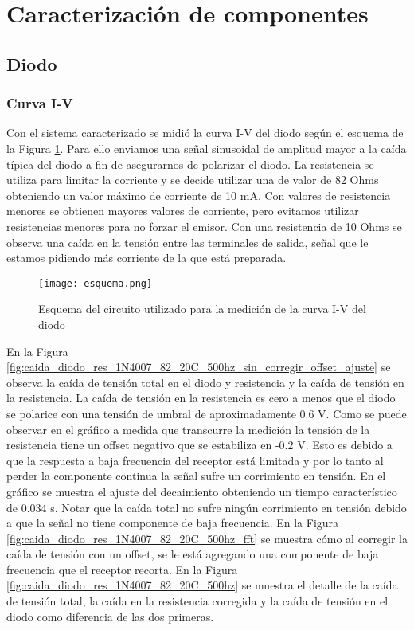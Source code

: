 \documentclass[a4paper, 11pt]{article}
\begin{document}
\section*{Caracterización de componentes}

\subsection*{Diodo}
\subsubsection*{Curva I-V}
Con el sistema caracterizado se midió la curva I-V del diodo según el esquema de la Figura \ref{fig:esquemadiodo}. Para ello enviamos una señal sinusoidal de amplitud mayor a la caída típica del diodo a fin de asegurarnos de polarizar el diodo. La resistencia se utiliza para limitar la corriente y se decide utilizar una de valor de 82 Ohms obteniendo un valor máximo de corriente de 10 mA. Con valores de resistencia menores se obtienen mayores valores de corriente, pero evitamos utilizar resistencias menores para no forzar el emisor. Con una resistencia de 10 Ohms se observa una caída en la tensión entre las terminales de salida, señal que le estamos pidiendo más corriente de la que está preparada.

\begin{figure} [H]
\centering
\texttt{[image: esquema.png]}
\caption{Esquema del circuito utilizado para la medición de la curva I-V del diodo \label{fig:esquemadiodo}}
\end{figure} 

En la Figura \ref{fig:caida_diodo_res_1N4007_82_20C_500hz_sin_corregir_offset_ajuste} se observa la caída de tensión total en el diodo y resistencia y la caída de tensión en la resistencia. La caída de tensión en la resistencia es cero a menos que el diodo se polarice con una tensión de umbral de aproximadamente 0.6 V. Como se puede observar en el gráfico a medida que transcurre la medición la tensión de la resistencia tiene un offset negativo que se estabiliza en -0.2 V. Esto es debido a que la respuesta a baja frecuencia del receptor está limitada y por lo tanto al perder la componente continua la señal sufre un corrimiento en tensión. En el gráfico se muestra el ajuste del decaimiento obteniendo un tiempo característico de 0.034 s. Notar que la caída total no sufre ningún corrimiento en tensión debido a que la señal no tiene componente de baja frecuencia. 
En la Figura \ref{fig:caida_diodo_res_1N4007_82_20C_500hz_fft} se muestra cómo al corregir la caída de tensión con un offset, se le está agregando una componente de baja frecuencia que el receptor recorta. En la Figura \ref{fig:caida_diodo_res_1N4007_82_20C_500hz} se muestra el detalle de la caída de tensión total, la caída en la resistencia corregida y la caída de tensión en el diodo como diferencia de las dos primeras.
\end{document}
